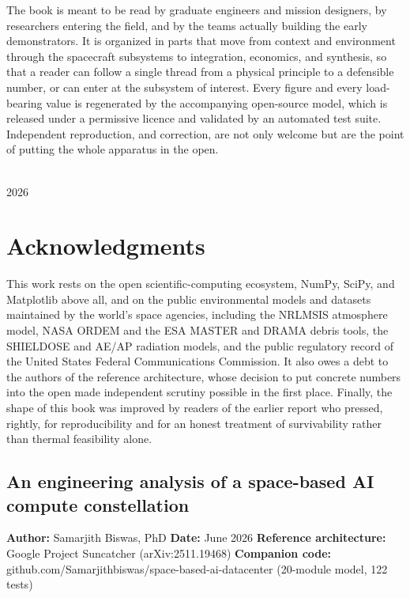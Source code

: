 \documentclass[
  11pt,
  openany,
  oneside]{book}
\begin{document}
The book is meant to be read by graduate engineers and mission designers, by researchers entering the
field, and by the teams actually building the early demonstrators. It is organized in parts that move
from context and environment through the spacecraft subsystems to integration, economics, and synthesis,
so that a reader can follow a single thread from a physical principle to a defensible number, or can
enter at the subsystem of interest. Every figure and every load-bearing value is regenerated by the
accompanying open-source model, which is released under a permissive licence and validated by an
automated test suite. Independent reproduction, and correction, are not only welcome but are the point of
putting the whole apparatus in the open.

\vspace{10pt}
\\
{\small\color{brandGray} 2026}
\clearpage

\chapter*{Acknowledgments}
This work rests on the open scientific-computing ecosystem, NumPy, SciPy, and Matplotlib above all, and
on the public environmental models and datasets maintained by the world's space agencies, including the
NRLMSIS atmosphere model, NASA ORDEM and the ESA MASTER and DRAMA debris tools, the SHIELDOSE and
AE/AP radiation models, and the public regulatory record of the United States Federal Communications
Commission. It also owes a debt to the authors of the reference architecture, whose decision to put
concrete numbers into the open made independent scrutiny possible in the first place. Finally, the shape
of this book was improved by readers of the earlier report who pressed, rightly, for reproducibility and
for an honest treatment of survivability rather than thermal feasibility alone.
\clearpage

\mainmatter
\section{An engineering analysis of a space-based AI compute
constellation}\label{an-engineering-analysis-of-a-space-based-ai-compute-constellation}

\textbf{Author:} Samarjith Biswas, PhD \textbf{Date:} June 2026
\textbf{Reference architecture:} Google Project Suncatcher
(arXiv:2511.19468) \textbf{Companion code:}
github.com/Samarjithbiswas/space-based-ai-datacenter (20-module model,
122 tests)
\end{document}
